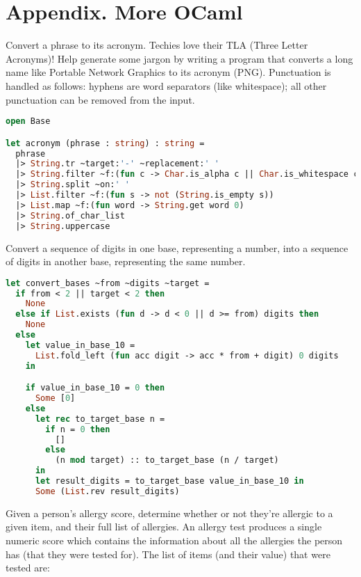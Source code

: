 \section*{Appendix. More OCaml}

Convert a phrase to its acronym.
Techies love their TLA (Three Letter Acronyms)!
Help generate some jargon by writing a program that converts a long name like Portable Network Graphics to its acronym (PNG).
Punctuation is handled as follows: hyphens are word separators (like whitespace); all other punctuation can be removed from the input.

\begin{lstlisting}[language=OCaml]
open Base

let acronym (phrase : string) : string =
  phrase
  |> String.tr ~target:'-' ~replacement:' '
  |> String.filter ~f:(fun c -> Char.is_alpha c || Char.is_whitespace c)
  |> String.split ~on:' '
  |> List.filter ~f:(fun s -> not (String.is_empty s))
  |> List.map ~f:(fun word -> String.get word 0)
  |> String.of_char_list
  |> String.uppercase
\end{lstlisting}

Convert a sequence of digits in one base, representing a number, into a sequence of digits in another base, representing the same number.

\begin{lstlisting}[language=OCaml]
let convert_bases ~from ~digits ~target =
  if from < 2 || target < 2 then
    None
  else if List.exists (fun d -> d < 0 || d >= from) digits then
    None
  else
    let value_in_base_10 =
      List.fold_left (fun acc digit -> acc * from + digit) 0 digits
    in

    if value_in_base_10 = 0 then
      Some [0]
    else
      let rec to_target_base n =
        if n = 0 then
          []
        else
          (n mod target) :: to_target_base (n / target)
      in
      let result_digits = to_target_base value_in_base_10 in
      Some (List.rev result_digits)
\end{lstlisting}

Given a person's allergy score, determine whether or not they're allergic to a given item, and their full list of allergies.
An allergy test produces a single numeric score which contains the information about all the allergies the person has (that they were tested for).
The list of items (and their value) that were tested are:

